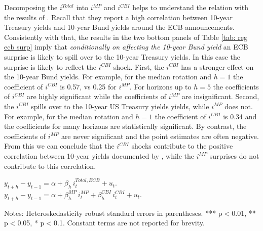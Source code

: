 \documentclass[a4paper,12pt]{article}
\newcommand{\pathTables}{../workm_lp/}
\begin{document}
Decomposing the $i^{Total}$ into $i^{MP}$ and $i^{CBI}$ helps to understand the relation with
the results of \cite{Curcuru_etal_2018}. Recall that they report a high
correlation between 10-year Treasury yields and 10-year Bund yields around the ECB announcements.
Consistently with that, the results in the two bottom panels of Table \ref{tab: reg ecb surp} imply
that \emph{conditionally on affecting the 10-year Bund yield} an ECB surprise is likely to spill over to the 10-year Treasury yields. In this case the surprise is likely to reflect the $i^{CBI}$ shock.
First, the $i^{CBI}$ has a stronger effect on the 10-year Bund yields.
For example, for the median rotation and $h=1$ the coefficient of $i^{CBI}$ is 0.57, vs 0.25 for $i^{MP}$. For horizons up to $h=5$ the coefficients of $i^{CBI}$ are highly significant while the coefficients of $i^{MP}$ are insignificant.
Second, the $i^{CBI}$ spills over to the 10-year US Treasury yields yields, while $i^{MP}$ does not.
For example, for the median rotation and $h=1$ the coefficient of $i^{CBI}$ is 0.34 and the coefficients for many horizons are statistically significant. By contrast, the coefficients of $i^{MP}$ are never significant and the point estimates are often negative. 
From this we can conclude that the $i^{CBI}$ shocks contribute to the positive correlation between 10-year yields documented by \cite{Curcuru_etal_2018}, while the $i^{MP}$ surprises do not contribute to this correlation.


\renewcommand\textfraction{.02}

\begin{table}[!htbp]
\begin{center}
\caption{The effect of ECB interest rate surprises and shocks on financial variables}\label{tab: reg ecb surp}
$y^{}_{t+h}-y^{}_{t-1} = \alpha + \beta_h\, i^{Total,ECB}_t + u_t.$\\
$y^{}_{t+h}-y^{}_{t-1} = \alpha + \beta^{MP}_h\, i^{MP}_t + \beta^{CBI}_h\, i^{CBI}_t + u_t.$
\small
{}
\end{center}\footnotesize
Notes: Heteroskedasticity robust standard errors in parentheses. *** p$<$0.01, ** p$<$0.05, * p$<$0.1.
Constant terms are not reported for brevity.
\end{table}
\end{document}
